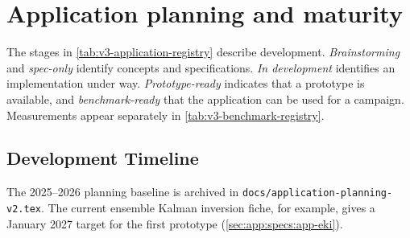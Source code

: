 \section{Application planning and maturity}
\label{sec:app:specs:proposed}

The stages in \cref{tab:v3-application-registry} describe development.
\emph{Brainstorming} and \emph{spec-only} identify concepts and
specifications. \emph{In development} identifies an implementation
under way. \emph{Prototype-ready} indicates that a prototype is
available, and \emph{benchmark-ready} that the application can be used
for a campaign. Measurements appear separately in
\cref{tab:v3-benchmark-registry}.

\subsection{Development Timeline}

The 2025--2026 planning baseline is archived in
\nolinkurl{docs/application-planning-v2.tex}. The current ensemble
Kalman inversion fiche, for example, gives a January 2027 target for
the first prototype (\cref{sec:app:specs:app-eki}).
